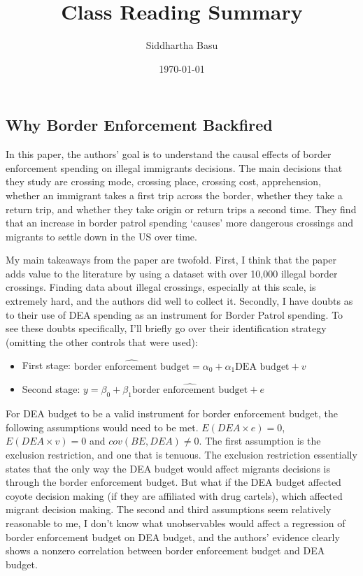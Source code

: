 \documentclass[12 pt, leqno]{article}
\begin{document}
\title{Class Reading Summary}
\author{Siddhartha Basu}
\date{\today}
\maketitle

\subsection*{Why Border Enforcement Backfired}

In this paper, the authors' goal is to understand the causal effects of border enforcement spending on illegal immigrants decisions. The main decisions that they study are crossing mode, crossing place, crossing cost, apprehension, whether an immigrant takes a first trip across the border, whether they take a return trip, and whether they take origin or return trips a second time. They find that an increase in border patrol spending `causes' more dangerous crossings and migrants to settle down in the US over time.  

My main takeaways from the paper are twofold. First, I think that the paper adds value to the literature by using a dataset with over 10,000 illegal border crossings. Finding data about illegal crossings, especially at this scale, is extremely hard, and the authors did well to collect it. Secondly, I have doubts as to their use of DEA spending as an instrument for Border Patrol spending. To see these doubts specifically, I'll briefly go over their identification strategy (omitting the other controls that were used):

\begin{itemize}
\item First stage: $\hat{\text{border enforcement budget}} = \alpha_0 + \alpha_1 \text{DEA budget} + v$
\item Second stage: $y = \beta_0 + \beta_1 \hat{\text{border enforcement budget}} + e$
\end{itemize}

For DEA budget to be a valid instrument for border enforcement budget, the following assumptions would need to be met. $E(DEA \times e) = 0$, $E(DEA \times v) = 0$ and $cov(BE, DEA) \neq 0$. The first assumption is the exclusion restriction, and one that is tenuous. The exclusion restriction essentially states that the only way the DEA budget would affect migrants decisions is through the border enforcement budget. But what if the DEA budget affected coyote decision making (if they are affiliated with drug cartels), which affected migrant decision making. The second and third assumptions seem relatively reasonable to me, I don't know what unobservables would affect a regression of border enforcement budget on DEA budget, and the authors' evidence clearly shows a nonzero correlation between border enforcement budget and DEA budget. 
\end{document}

